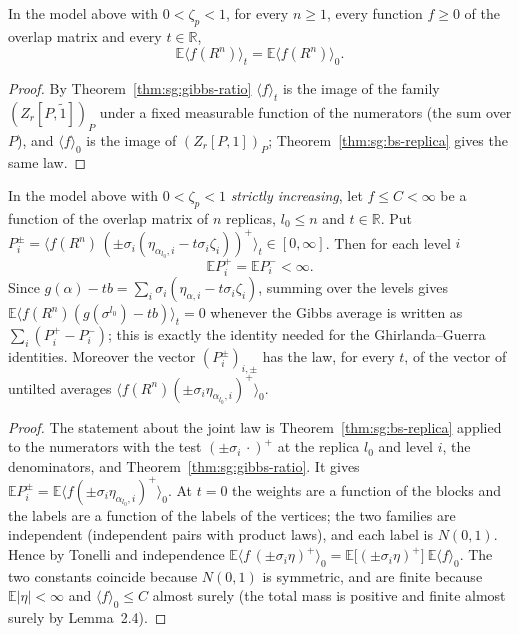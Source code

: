 \begin{theorem}[Lemma~2.5 for $k=0$]\label{thm:sg:lemma25-zero}
  \leanok
In the model above with $0<\zeta_p<1$, for every $n\ge1$, every function $f\ge0$ of the overlap matrix and every $t\in\mathbb R$,
\[
 \mathbb E\langle f(R^n)\rangle_t=\mathbb E\langle f(R^n)\rangle_0.
\]
\end{theorem}
\begin{proof}
  \leanok
By Theorem~\ref{thm:sg:gibbs-ratio} $\langle f\rangle_t$ is the image of the family $(Z_r[P,\tilde1])_P$ under a fixed measurable function of the numerators
(the sum over $P$), and $\langle f\rangle_0$ is the image of $(Z_r[P,1])_P$; Theorem~\ref{thm:sg:bs-replica} gives the same law.
\end{proof}

\begin{theorem}[Lemma~2.5 for $k=(1,0,\dots,0)$]\label{thm:sg:lemma25-one}
  \leanok
In the model above with $0<\zeta_p<1$ \emph{strictly increasing}, let $f\le C<\infty$ be a function of the overlap matrix of $n$ replicas, $l_0\le n$ and $t\in\mathbb R$.
Put $P_i^\pm=\big\langle f(R^n)\,(\pm\sigma_i(\eta_{\alpha_{l_0},i}-t\sigma_i\zeta_i))^+\big\rangle_t\in[0,\infty]$. Then for each level $i$
\[
 \mathbb EP_i^+=\mathbb EP_i^-<\infty .
\]
Since $g(\alpha)-tb=\sum_i\sigma_i(\eta_{\alpha,i}-t\sigma_i\zeta_i)$, summing over the levels gives $\mathbb E\langle f(R^n)(g(\sigma^{l_0})-tb)\rangle_t=0$
whenever the Gibbs average is written as $\sum_i(P_i^+-P_i^-)$; this is exactly the identity needed for the Ghirlanda--Guerra identities.
Moreover the vector $(P^\pm_i)_{i,\pm}$ has the law, for every $t$, of the vector of untilted averages $\big\langle f(R^n)(\pm\sigma_i\eta_{\alpha_{l_0},i})^+\big\rangle_0$.
\end{theorem}
\begin{proof}
  \leanok
The statement about the joint law is Theorem~\ref{thm:sg:bs-replica} applied to the numerators with the test $(\pm\sigma_i\,\cdot)^+$ at the replica $l_0$ and level $i$,
the denominators, and Theorem~\ref{thm:sg:gibbs-ratio}. It gives $\mathbb EP_i^\pm=\mathbb E\langle f(\pm\sigma_i\eta_{\alpha_{l_0},i})^+\rangle_0$.
At $t=0$ the weights are a function of the blocks and the labels are a function of the labels of the vertices; the two families are independent (independent
pairs with product laws), and each label is $N(0,1)$. Hence by Tonelli and independence
$\mathbb E\langle f\,(\pm\sigma_i\eta)^+\rangle_0=\mathbb E\big[(\pm\sigma_i\eta)^+\big]\ \mathbb E\langle f\rangle_0$. The two constants coincide because $N(0,1)$
is symmetric, and are finite because $\mathbb E|\eta|<\infty$ and $\langle f\rangle_0\le C$ almost surely (the total mass is positive and finite almost surely by Lemma~2.4).
\end{proof}

